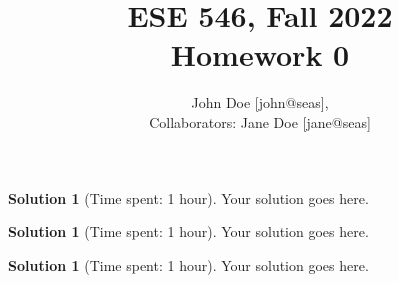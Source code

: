 \documentclass[11pt, reqno, letterpaper, twoside]{amsart}
\title{ESE 546, Fall 2022\\[0.1in]
Homework 0}
\author{
John Doe [john@seas],\\
Collaborators: Jane Doe [jane@seas]
}
\theoremstyle{plain}
\theoremstyle{definition}
\newtheorem{solution}[theorem]{Solution}
\begin{document}
\maketitle

\begin{solution}[Time spent: 1 hour]

Your solution goes here.
\end{solution}

\clearpage
\begin{solution}[Time spent: 1 hour]
Your solution goes here.
\end{solution}

\clearpage
\begin{solution}[Time spent: 1 hour]
Your solution goes here.
\end{solution}
\end{document}
